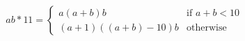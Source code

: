 \documentclass[preview]{standalone}
\begin{document}
\begin{align*}
ab * 11 =\begin{cases}a(a+b)b & \text{if } a + b < 10 \\(a + 1)((a + b) - 10)b & \text{otherwise}\end{cases}
\end{align*}
\end{document}
